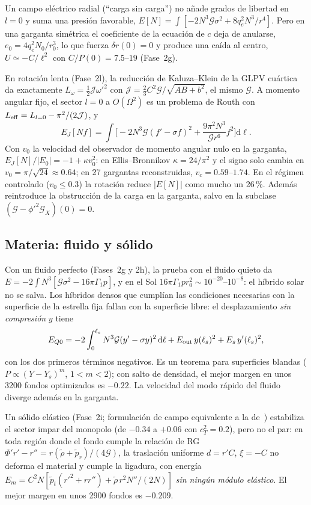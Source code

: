 \documentclass[11pt,a4paper]{article}
\theoremstyle{remark}
\newcommand{\G}{\mathcal G}
\newcommand{\dd}{\mathrm d}
\begin{document}
Un campo eléctrico radial (``carga sin carga'') no añade grados de libertad en $l=0$ y suma una presión favorable, $E[N]=\int[-2N^3\G\sigma^2+8q_e^2N^3/r^4]$. Pero en una garganta simétrica el coeficiente de la ecuación de $c$ deja de anularse, $e_0=4q_e^2N_0/r_0^3$, lo que fuerza $\delta r(0)=0$ y produce una caída al centro, $U\simeq-C/\ell^2$ con $C/P(0)=7.5$--$19$ (Fase~2g).

En rotación lenta (Fase~2l), la reducción de Kaluza--Klein de la GLPV cuártica da exactamente $L_\omega=\tfrac12\mathcal J\omega'^2$ con $\mathcal J=\tfrac23C^2\G/\sqrt{AB+b^2}$, el mismo $\G$. A momento angular fijo, el sector $l=0$ a $O(\Omega^2)$ es un problema de Routh con $L_{\rm eff}=L_{l=0}-\pi^2/(2\mathcal J)$, y
\begin{equation}
E_J[Nf]=\int\Big[-2N^3\G(f'-\sigma f)^2+\frac{9\pi^2N^3}{\G r^6}f^2\Big]\dd\ell .
\end{equation}
Con $v_0$ la velocidad del observador de momento angular nulo en la garganta, $E_J[N]/|E_0|=-1+\kappa v_0^2$: en Ellis--Bronnikov $\kappa=24/\pi^2$ y el signo solo cambia en $v_0=\pi/\sqrt{24}\approx0.64$; en 27 gargantas reconstruidas, $v_c=0.59$--$1.74$. En el régimen controlado ($v_0\le0.3$) la rotación reduce $|E[N]|$ como mucho un 26\,\%. Además reintroduce la obstrucción de la carga en la garganta, salvo en la subclase $(\G-\phi'^2\G_X)(0)=0$.

\subsection{Materia: fluido y sólido}

Con un fluido perfecto (Fases~2g y 2h), la prueba con el fluido quieto da $E=-2\int N^3[\G\sigma^2-16\pi\Gamma_1p]$, y en el Sol $16\pi\Gamma_1pr_0^2\sim10^{-20}$--$10^{-8}$: el híbrido solar no se salva. Los híbridos densos que cumplían las condiciones necesarias con la superficie de la estrella fija fallan con la superficie libre: el desplazamiento \emph{sin compresión} $y$ tiene
\begin{equation}
E_{Q0}=-2\int_0^{\ell_s}N^3\G(y'-\sigma y)^2\,\dd\ell+E_{\rm out}\,y(\ell_s)^2+E_s\,y'(\ell_s)^2 ,
\end{equation}
con los dos primeros términos negativos. Es un teorema para superficies blandas ($P\propto(Y-Y_s)^m$, $1<m<2$); con salto de densidad, el mejor margen en unos 3200 fondos optimizados es $-0.22$. La velocidad del modo rápido del fluido diverge además en la garganta.

Un sólido elástico (Fase~2i; formulación de campo equivalente a la de~\cite{KarloviniSamuelsson}) estabiliza el sector impar del monopolo (de $-0.34$ a $+0.06$ con $c_T^2=0.2$), pero no el par: en toda región donde el fondo cumple la relación de RG $\Phi'r'-r''=r(\tilde\rho+\tilde p_r)/(4\G)$, la traslación uniforme $d=r'C$, $\xi=-C$ no deforma el material y cumple la ligadura, con energía
$E_m=C^2N[\tilde p_t(r'^2+rr'')+\tilde\rho\,r^2N''/(2N)]$ \emph{sin ningún módulo elástico}. El mejor margen en unos 2900 fondos es $-0.209$.
\end{document}
